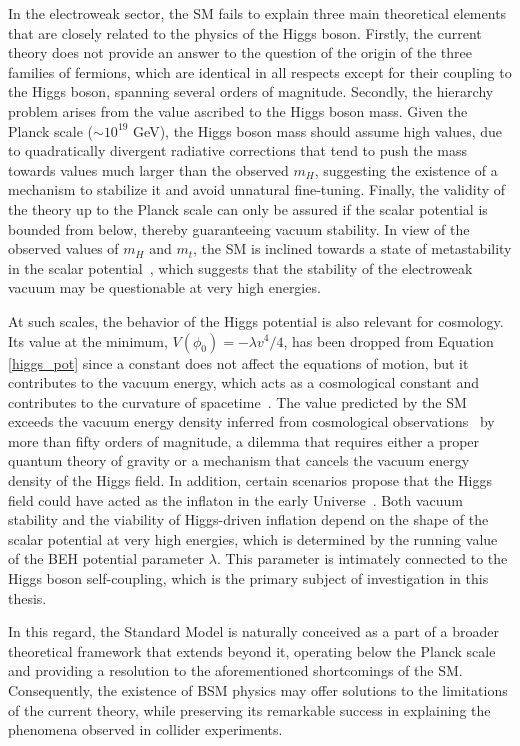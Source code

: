 In the electroweak sector, the SM fails to explain three main theoretical elements that are closely related to the physics of the Higgs boson. Firstly, the current theory does not provide an answer to the question of the origin of the three families of fermions, which are identical in all respects except for their coupling to the Higgs boson, spanning several orders of magnitude. Secondly, the hierarchy problem arises from the value ascribed to the Higgs boson mass. Given the Planck scale ($\sim10^{19}$ GeV), the Higgs boson mass should assume high values, due to quadratically divergent radiative corrections that tend to push the mass towards values much larger than the observed $m_{H}$, suggesting the existence of a mechanism to stabilize it and avoid unnatural fine-tuning. Finally, the validity of the theory up to the Planck scale can only be assured if the scalar potential is bounded from below, thereby guaranteeing vacuum stability. In view of the observed values of $m_H$ and $m_t$, the SM is inclined towards a state of metastability in the scalar potential~\cite{EliasMiro:2011aa}, which suggests that the stability of the electroweak vacuum may be questionable at very high energies.

At such scales, the behavior of the Higgs potential is also relevant for cosmology. Its value at the minimum, $V(\phi_0) = -\lambda v^4/4$, has been dropped from Equation \ref{higgs_pot} since a constant does not affect the equations of motion, but it contributes to the vacuum energy, which acts as a cosmological constant and contributes to the curvature of spacetime~\cite{Weinberg:1988cp,Martin:2012bt}. The value predicted by the SM exceeds the vacuum energy density inferred from cosmological observations~\cite{Planck:2018vyg} by more than fifty orders of magnitude, a dilemma that requires either a proper quantum theory of gravity or a mechanism that cancels the vacuum energy density of the Higgs field. In addition, certain scenarios propose that the Higgs field could have acted as the inflaton in the early Universe~\cite{Bezrukov:2007ep,Bezrukov:2013fka}. Both vacuum stability and the viability of Higgs-driven inflation depend on the shape of the scalar potential at very high energies, which is determined by the running value of the BEH potential parameter $\lambda$. This parameter is intimately connected to the Higgs boson self-coupling, which is the primary subject of investigation in this thesis.


In this regard, the Standard Model is naturally conceived as a part of a broader theoretical framework that extends beyond it, operating below the Planck scale and providing a resolution to the aforementioned shortcomings of the SM. Consequently, the existence of BSM physics may offer solutions to the limitations of the current theory, while preserving its remarkable success in explaining the phenomena observed in collider experiments.

